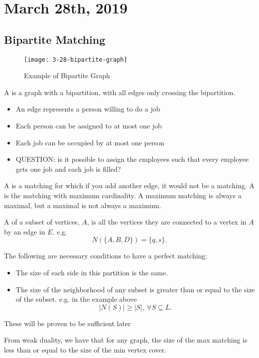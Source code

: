 \documentclass[../main/main.tex]{subfiles}
\begin{document}
\section{March 28th, 2019}
\subsection{Bipartite Matching}
\begin{figure}[h!]
	\centering
	\texttt{[image: 3-28-bipartite-graph]}
	\caption{Example of Bipartite Graph}
	\label{fig:3-28-bipartitegraph}
\end{figure}
\begin{definition}
	A  is a graph with a bipartition, with all edges only crossing the bipartition.
\end{definition}
\begin{itemize}
	\item An edge represents a person willing to do a job
	\item Each person can be assigned to at most one job
	\item Each job can be occupied by at most one person
	\item QUESTION: is it possible to assign the employees such that every employee gets one job and each job is filled? 
\end{itemize}
\begin{remark} 
	A  is a matching for which if you add another edge, it would not be a matching. A  is the matching with maximum cardinality. A maximum matching is always a maximal, but a maximal is not always a maximum.
\end{remark}
\begin{definition}
	A  of a subset of vertices, $A$, is all the vertices they are connected to a vertex in $A$ by an edge in $E$. e.g. \[
		N\left( \{A,B,D\}  \right) =\{q,s\} 
	.\] 
\end{definition}
\begin{remark}
	The following are necessary conditions to have a perfect matching:
	\begin{itemize}
		\item The size of each side in this partition is the same.
		\item The size of the neighborhood of any subset is greater than or equal to the size of the subset. e.g. in the example above \[
				|N(S)|\ge |S|,\ \forall S \subseteq L
		.\] 
	\end{itemize}
	\vspace{-0.2cm}
	These will be proven to be sufficient later 
\end{remark}\vspace{-0.2cm}
From weak duality, we have that for any graph, the size of the max matching is less than or equal to the size of the min vertex cover.
\vspace{-0.45cm}
\end{document}
